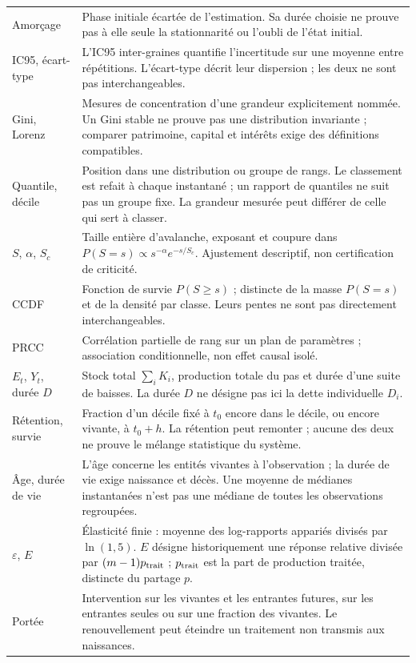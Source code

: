 \begin{longtable}{@{}p{.21\linewidth}p{.73\linewidth}@{}}
Amorçage & Phase initiale écartée de l'estimation. Sa durée choisie ne prouve pas à elle seule la stationnarité ou l'oubli de l'état initial. \\
IC95, écart-type & L'IC95 inter-graines quantifie l'incertitude sur une moyenne entre répétitions. L'écart-type décrit leur dispersion ; les deux ne sont pas interchangeables. \\
Gini, Lorenz & Mesures de concentration d'une grandeur explicitement nommée. Un Gini stable ne prouve pas une distribution invariante ; comparer patrimoine, capital et intérêts exige des définitions compatibles. \\
Quantile, décile & Position dans une distribution ou groupe de rangs. Le classement est refait à chaque instantané ; un rapport de quantiles ne suit pas un groupe fixe. La grandeur mesurée peut différer de celle qui sert à classer. \\
$S$, $\alpha$, $S_c$ & Taille entière d'avalanche, exposant et coupure dans $P(S=s)\propto s^{-\alpha}e^{-s/S_c}$. Ajustement descriptif, non certification de criticité. \\
CCDF & Fonction de survie $P(S\ge s)$ ; distincte de la masse $P(S=s)$ et de la densité par classe. Leurs pentes ne sont pas directement interchangeables. \\
PRCC & Corrélation partielle de rang sur un plan de paramètres ; association conditionnelle, non effet causal isolé. \\
$E_t$, $Y_t$, durée $D$ & Stock total $\sum_iK_i$, production totale du pas et durée d'une suite de baisses. La durée $D$ ne désigne pas ici la dette individuelle $D_i$. \\
Rétention, survie & Fraction d'un décile fixé à $t_0$ encore dans le décile, ou encore vivante, à $t_0+h$. La rétention peut remonter ; aucune des deux ne prouve le mélange statistique du système. \\
Âge, durée de vie & L'âge concerne les entités vivantes à l'observation ; la durée de vie exige naissance et décès. Une moyenne de médianes instantanées n'est pas une médiane de toutes les observations regroupées. \\
$\varepsilon$, $E$ & Élasticité finie : moyenne des log-rapports appariés divisés par $\ln(1{,}5)$. $E$ désigne historiquement une réponse relative divisée par $(m-1)p_{\rm trait}$ ; $p_{\rm trait}$ est la part de production traitée, distincte du partage $p$. \\
Portée & Intervention sur les vivantes et les entrantes futures, sur les entrantes seules ou sur une fraction des vivantes. Le renouvellement peut éteindre un traitement non transmis aux naissances. \\

\end{longtable}
